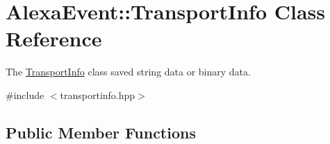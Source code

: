 \hypertarget{classAlexaEvent_1_1TransportInfo}{}\section{Alexa\+Event\+:\+:Transport\+Info Class Reference}
\label{classAlexaEvent_1_1TransportInfo}


The \hyperlink{classAlexaEvent_1_1TransportInfo}{Transport\+Info} class saved string data or binary data.  




{\ttfamily \#include $<$transportinfo.\+hpp$>$}

\subsection*{Public Member Functions}

